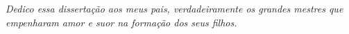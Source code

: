 \begin{dedicatoria}
   \vspace*{\fill}
   \centering
   \noindent
   \textit{Dedico essa dissertação aos meus pais, verdadeiramente os grandes mestres que empenharam amor e suor na formação dos seus filhos.} \vspace*{\fill}
\end{dedicatoria}
